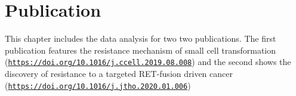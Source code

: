 \section{Publication}
\label{cascade-sec:publication}

This chapter includes the data analysis for two two publications.
The first publication features the resistance mechanism of small cell transformation (\href{https://doi.org/10.1016/j.ccell.2019.08.008}{\nolinkurl{https://doi.org/10.1016/j.ccell.2019.08.008}}\cite{Burr2019}) and the second shows the discovery of resistance to a targeted RET-fusion driven cancer (\href{https://doi.org/10.1016/j.jtho.2020.01.006}{\nolinkurl{https://doi.org/10.1016/j.jtho.2020.01.006}}\cite{Solomon2020})